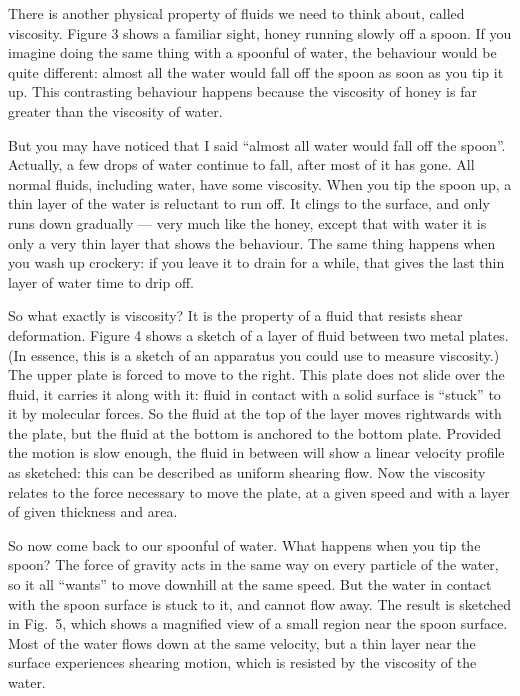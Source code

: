   There is another physical property of fluids we need to think about, called 
  viscosity. Figure 3 shows a familiar sight, honey running slowly off a spoon. 
  If you imagine doing the same thing with a spoonful of water, the behaviour 
  would be quite different: almost all the water would fall off the spoon as 
  soon as you tip it up. This contrasting behaviour happens because the 
  viscosity of honey is far greater than the viscosity of water. 

  But you may have noticed that I said “almost all water would fall off the 
  spoon”. Actually, a few drops of water continue to fall, after most of it has 
  gone. All normal fluids, including water, have some viscosity. When you tip 
  the spoon up, a thin layer of the water is reluctant to run off. It clings to 
  the surface, and only runs down gradually — very much like the honey, except 
  that with water it is only a very thin layer that shows the behaviour. The 
  same thing happens when you wash up crockery: if you leave it to drain for a 
  while, that gives the last thin layer of water time to drip off. 

  So what exactly is viscosity? It is the property of a fluid that resists 
  shear deformation. Figure 4 shows a sketch of a layer of fluid between two 
  metal plates. (In essence, this is a sketch of an apparatus you could use to 
  measure viscosity.) The upper plate is forced to move to the right. This 
  plate does not slide over the fluid, it carries it along with it: fluid in 
  contact with a solid surface is “stuck” to it by molecular forces. So the 
  fluid at the top of the layer moves rightwards with the plate, but the fluid 
  at the bottom is anchored to the bottom plate. Provided the motion is slow 
  enough, the fluid in between will show a linear velocity profile as sketched: 
  this can be described as uniform shearing flow. Now the viscosity relates to 
  the force necessary to move the plate, at a given speed and with a layer of 
  given thickness and area. 

  So now come back to our spoonful of water. What happens when you tip the 
  spoon? The force of gravity acts in the same way on every particle of the 
  water, so it all “wants” to move downhill at the same speed. But the water in 
  contact with the spoon surface is stuck to it, and cannot flow away. The 
  result is sketched in Fig.\ 5, which shows a magnified view of a small region 
  near the spoon surface. Most of the water flows down at the same velocity, 
  but a thin layer near the surface experiences shearing motion, which is 
  resisted by the viscosity of the water. 

